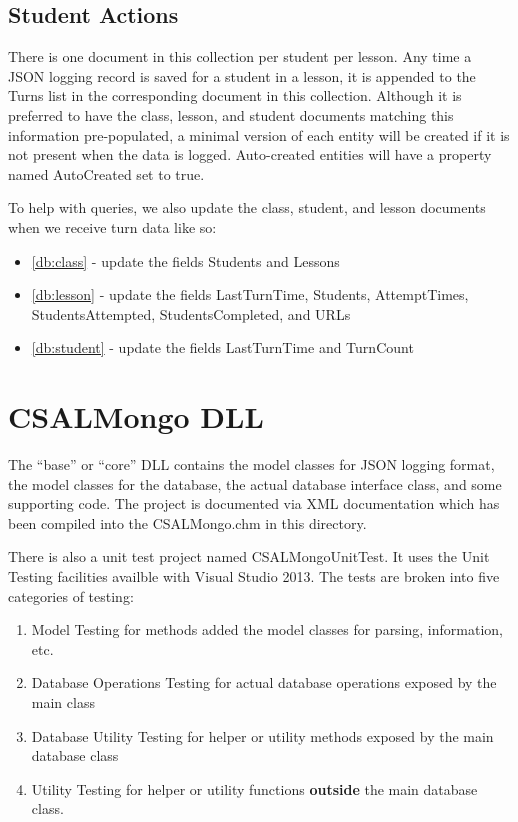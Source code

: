 \documentclass[letterpaper,10pt]{article}
\newcommand{\fullxref}[1]{ \ref{#1} \nameref{#1} }
\begin{document}
\subsection{Student Actions}
\label{db:turns}

There is one document in this collection per student per lesson. Any time a
JSON logging record is saved for a student in a lesson, it is appended to
the Turns list in the corresponding document in this collection. Although it
is preferred to have the class, lesson, and student documents matching this
information pre-populated, a minimal version of each entity will be created
if it is not present when the data is logged.  Auto-created entities will have
a property named AutoCreated set to true.

To help with queries, we also update the class, student, and lesson documents
when we receive turn data like so:

\begin{itemize}
    \item \fullxref{db:class} - update the fields Students and Lessons
    \item \fullxref{db:lesson} -  update the fields LastTurnTime, Students,
          AttemptTimes, StudentsAttempted, StudentsCompleted, and URLs
    \item \fullxref{db:student} -  update the fields LastTurnTime and TurnCount
\end{itemize}




\section{CSALMongo DLL}

The ``base'' or ``core'' DLL contains the model classes for JSON logging
format, the model classes for the database, the actual database interface
class, and some supporting code.  The project is documented via XML documentation
which has been compiled into the CSALMongo.chm in this directory.

There is also a unit test project named CSALMongoUnitTest. It uses the Unit
Testing facilities availble with Visual Studio 2013. The tests are broken into
five categories of testing:

\begin{enumerate}
    \item Model Testing for methods added the model classes for
          parsing, information, etc.
    
    \item Database Operations Testing for actual database operations exposed
          by the main class
    
    \item Database Utility Testing for helper or utility methods exposed by
          the main database class
    
    \item Utility Testing for helper or utility functions \textbf{outside} the 
          main database class.
\end{enumerate}
\end{document}
